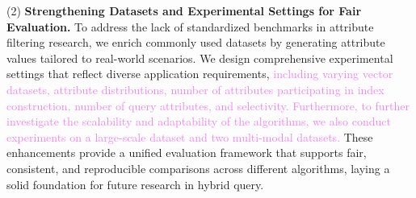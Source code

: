 \documentclass[sigconf, nonacm]{acmart}
\begin{document}
	(2) \textbf{Strengthening Datasets and Experimental Settings for Fair Evaluation.}
	To address the lack of standardized benchmarks in attribute filtering research, we enrich commonly used datasets by generating attribute values tailored to real-world scenarios. We design comprehensive experimental settings that reflect diverse application requirements, \textcolor{violet}{including varying vector datasets, attribute distributions, number of attributes participating in index construction, number of query attributes, and selectivity. Furthermore, to further investigate the scalability and adaptability of the algorithms, we also conduct experiments on a large-scale dataset and two multi-modal datasets.}  These enhancements provide a unified evaluation framework that supports fair, consistent, and reproducible comparisons across different algorithms, laying a solid foundation for future research in hybrid query.


\end{document}
